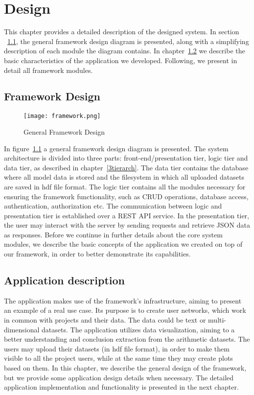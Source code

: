 
\chapter{Design} %
\label{chapter4_d}
This chapter provides a detailed description of the designed system. In section ~\ref{gfd}, the general framework design diagram is presented, along with a simplifying description of each module the diagram contains. In chapter~\ref{app_d} we describe the basic characteristics of the application we developed. Following, we present in detail all framework modules.


\section{Framework Design}
\label{gfd}
\begin{figure}
	\centerline{\texttt{[image: framework.png]}}
	\caption{General Framework Design}
	\label{framework}
\end{figure}
In figure~\ref{framework} a general framework design diagram is presented. The system architecture is divided into three parts: front-end/presentation tier, logic tier and data tier, as described in chapter~\ref{3tierarch}. The data tier contains the database where all model data is stored and the filesystem in which all uploaded datasets are saved in hdf file format. The logic tier contains all the modules necessary for ensuring the framework functionality, such as CRUD operations, database access, authentication, authorization etc. The communication between logic and presentation tier is established over a REST API service. In the presentation tier, the user may interact with the server by sending requests and retrieve JSON data as responses. Before we continue in further details about the core system modules,  we describe the basic concepts of the application we created on top of our framework, in order to better demonstrate its capabilities.

\section{Application description}
\label{app_d}
The application makes use of the framework's infrastructure, aiming to present an example of a real use case. Its purpose is to create user networks, which work in common with projects and their data. The data could be text or multi-dimensional datasets. The application utilizes data visualization, aiming to a better understanding and conclusion extraction from the arithmetic datasets. The users may upload their datasets (in hdf file format), in order to make them visible to all the project users, while at the same time they may create plots based on them. In this chapter, we describe the general design of the framework, but we provide some application design details when necessary. The detailed application implementation and functionality is presented in the next chapter.

